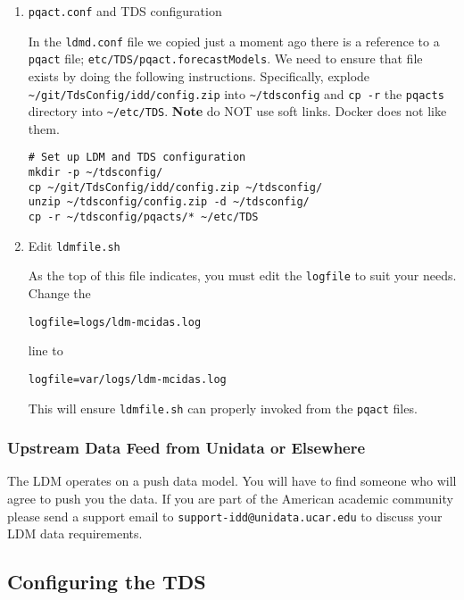 \documentclass[11pt]{article}
\begin{document}
\begin{enumerate}
\item \texttt{pqact.conf} and TDS configuration
\label{sec:orgheadline20}

In the \texttt{ldmd.conf} file we copied just a moment ago there is a reference to a \texttt{pqact} file; \texttt{etc/TDS/pqact.forecastModels}. We need to ensure that file exists by doing the following instructions. Specifically, explode \texttt{\textasciitilde{}/git/TdsConfig/idd/config.zip} into \texttt{\textasciitilde{}/tdsconfig} and \texttt{cp -r} the \texttt{pqacts} directory into \texttt{\textasciitilde{}/etc/TDS}. \textbf{Note} do NOT use soft links. Docker does not like them.

\begin{verbatim}
# Set up LDM and TDS configuration
mkdir -p ~/tdsconfig/
cp ~/git/TdsConfig/idd/config.zip ~/tdsconfig/
unzip ~/tdsconfig/config.zip -d ~/tdsconfig/
cp -r ~/tdsconfig/pqacts/* ~/etc/TDS
\end{verbatim}

\item Edit \texttt{ldmfile.sh}
\label{sec:orgheadline21}

As the top of this file indicates, you must edit the \texttt{logfile} to suit your needs. Change the 

\begin{verbatim}
logfile=logs/ldm-mcidas.log
\end{verbatim}

line to

\begin{verbatim}
logfile=var/logs/ldm-mcidas.log
\end{verbatim}

This will ensure \texttt{ldmfile.sh} can properly invoked from the \texttt{pqact} files.
\end{enumerate}

\subsubsection{Upstream Data Feed from Unidata or Elsewhere}
\label{sec:orgheadline23}

The LDM operates on a push data model. You will have to find someone who will agree to push you the data. If you are part of the American academic community please send a support email to \texttt{support-idd@unidata.ucar.edu} to discuss your LDM data requirements.

\subsection{Configuring the TDS}
\label{sec:orgheadline26}
\end{document}
